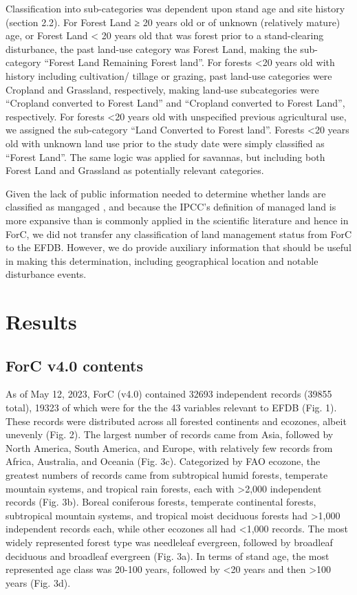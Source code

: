 \documentclass[, manuscript]{copernicus}
\begin{document}
Classification into sub-categories was dependent upon stand age and site
history (section 2.2). For Forest Land ≥ 20 years old or of unknown
(relatively mature) age, or Forest Land \textless{} 20 years old that
was forest prior to a stand-clearing disturbance, the past land-use
category was Forest Land, making the sub-category ``Forest Land
Remaining Forest land''. For forests \textless20 years old with history
including cultivation/ tillage or grazing, past land-use categories were
Cropland and Grassland, respectively, making land-use subcategories were
``Cropland converted to Forest Land'' and ``Cropland converted to Forest
Land'', respectively. For forests \textless20 years old with unspecified
previous agricultural use, we assigned the sub-category ``Land Converted
to Forest land''. Forests \textless20 years old with unknown land use
prior to the study date were simply classified as ``Forest Land''. The
same logic was applied for savannas, but including both Forest Land and
Grassland as potentially relevant categories.

Given the lack of public information needed to determine whether lands
are classified as mangaged
\citep{ogle_delineating_2018, deng_comparing_2021}, and because the
IPCC's definition of managed land is more expansive than is commonly
applied in the scientific literature and hence in ForC, we did not
transfer any classification of land management status from ForC to the
EFDB. However, we do provide auxiliary information that should be useful
in making this determination, including geographical location and
notable disturbance events.

\section{Results}

\subsection{ForC v4.0 contents}

As of May 12, 2023, ForC (v4.0) contained 32693 independent records
(39855 total), 19323 of which were for the the 43 variables relevant to
EFDB (Fig. 1). These records were distributed across all forested
continents and ecozones, albeit unevenly (Fig. 2). The largest number of
records came from Asia, followed by North America, South America, and
Europe, with relatively few records from Africa, Australia, and Oceania
(Fig. 3c). Categorized by FAO ecozone, the greatest numbers of records
came from subtropical humid forests, temperate mountain systems, and
tropical rain forests, each with \textgreater2,000 independent records
(Fig. 3b). Boreal coniferous forests, temperate continental forests,
subtropical mountain systems, and tropical moist deciduous forests had
\textgreater1,000 independent records each, while other ecozones all had
\textless1,000 records. The most widely represented forest type was
needleleaf evergreen, followed by broadleaf deciduous and broadleaf
evergreen (Fig. 3a). In terms of stand age, the most represented age
class was 20-100 years, followed by \textless20 years and then
\textgreater100 years (Fig. 3d).
\end{document}
